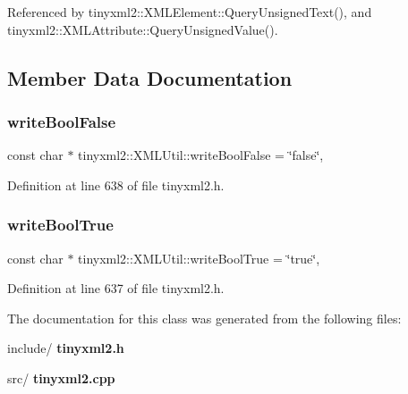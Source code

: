 Referenced by tinyxml2\+::\+X\+M\+L\+Element\+::\+Query\+Unsigned\+Text(), and tinyxml2\+::\+X\+M\+L\+Attribute\+::\+Query\+Unsigned\+Value().



\subsection{Member Data Documentation}
\mbox{\label{classtinyxml2_1_1_x_m_l_util_ae09aaf302e2ab8c196e14643ef98e3a3}} 
\subsubsection{write\+Bool\+False}
{\footnotesize\ttfamily const char $\ast$ tinyxml2\+::\+X\+M\+L\+Util\+::write\+Bool\+False = \char`\"{}false\char`\"{}\hspace{0.3cm}{\ttfamily [static]}, {\ttfamily [private]}}



Definition at line 638 of file tinyxml2.\+h.

\mbox{\label{classtinyxml2_1_1_x_m_l_util_aafa8c6e965f8f95d5bcd9e7646983470}} 
\subsubsection{write\+Bool\+True}
{\footnotesize\ttfamily const char $\ast$ tinyxml2\+::\+X\+M\+L\+Util\+::write\+Bool\+True = \char`\"{}true\char`\"{}\hspace{0.3cm}{\ttfamily [static]}, {\ttfamily [private]}}



Definition at line 637 of file tinyxml2.\+h.



The documentation for this class was generated from the following files\+:\begin{DoxyCompactItemize}
\item 
include/\textbf{ tinyxml2.\+h}\item 
src/\textbf{ tinyxml2.\+cpp}\end{DoxyCompactItemize}
